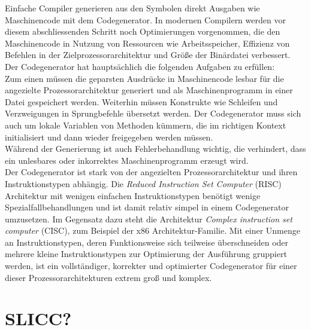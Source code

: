 Einfache Compiler generieren aus den Symbolen direkt Ausgaben wie Maschinencode mit dem Codegenerator.
In modernen Compilern werden vor diesem abschliessenden Schritt noch Optimierungen vorgenommen, die den Maschinencode in Nutzung von Ressourcen wie Arbeitsspeicher, Effizienz von Befehlen in der Zielprozessorarchitektur und Größe der Binärdatei verbessert.\\

Der Codegenerator hat hauptsächlich die folgenden Aufgaben zu erfüllen\cite{mossenbock:2024}:\\
Zum einen müssen die geparsten Ausdrücke in Maschinencode lesbar für die angezielte Prozessorarchitektur generiert und als Maschinenprogramm in einer Datei gespeichert werden.
Weiterhin müssen Konstrukte wie Schleifen und Verzweigungen in Sprungbefehle übersetzt werden.
Der Codegenerator muss sich auch um lokale Variablen von Methoden kümmern, die im richtigen Kontext initialisiert und dann wieder freigegeben werden müssen.\\
Während der Generierung ist auch Fehlerbehandlung wichtig, die verhindert, dass ein unlesbares oder inkorrektes Maschinenprogramm erzeugt wird.\\

Der Codegenerator ist stark von der angezielten Prozessorarchitektur und ihren Instruktionstypen abhängig.
Die \textit{Reduced Instruction Set Computer} (RISC) Architektur mit wenigen einfachen Instruktionstypen benötigt wenige Spezialfallbehandlungen und ist damit relativ simpel in einem Codegenerator umzusetzen.
Im Gegensatz dazu steht die Architektur \textit{Complex instruction set computer} (CISC), zum Beispiel der x86 Architektur-Familie. 
Mit einer Unmenge an Instruktionstypen, deren Funktionsweise sich teilweise überschneiden oder mehrere kleine Instruktionstypen zur Optimierung der Ausführung gruppiert werden, ist ein vollständiger, korrekter und optimierter Codegenerator für einer dieser Prozessorarchitekturen extrem groß und komplex.

\section{SLICC?}
